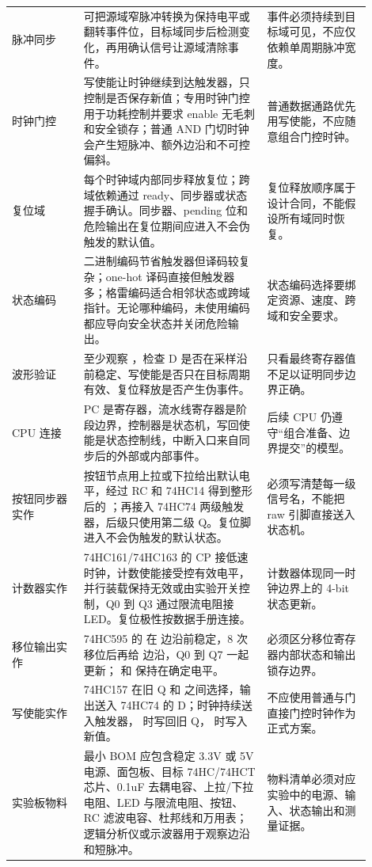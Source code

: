 \begin{longtable}{L{0.18\linewidth}L{0.46\linewidth}L{0.26\linewidth}}
脉冲同步 & 可把源域窄脉冲转换为保持电平或翻转事件位，目标域同步后检测变化，再用确认信号让源域清除事件。 & 事件必须持续到目标域可见，不应仅依赖单周期脉冲宽度。 \\
时钟门控 & 写使能让时钟继续到达触发器，只控制是否保存新值；专用时钟门控用于功耗控制并要求 enable 无毛刺和安全锁存；普通 AND 门切时钟会产生短脉冲、额外边沿和不可控偏斜。 & 普通数据通路优先用写使能，不应随意组合门控时钟。 \\
复位域 & 每个时钟域内部同步释放复位；跨域依赖通过 ready、同步器或状态握手确认。同步器、pending 位和危险输出在复位期间应进入不会伪触发的默认值。 & 复位释放顺序属于设计合同，不能假设所有域同时恢复。 \\
状态编码 & 二进制编码节省触发器但译码较复杂；one-hot 译码直接但触发器多；格雷编码适合相邻状态或跨域指针。无论哪种编码，未使用编码都应导向安全状态并关闭危险输出。 & 状态编码选择要绑定资源、速度、跨域和安全要求。 \\
波形验证 & 至少观察 ，检查 D 是否在采样沿前稳定、写使能是否只在目标周期有效、复位释放是否产生伪事件。 & 只看最终寄存器值不足以证明同步边界正确。 \\
CPU 连接 & PC 是寄存器，流水线寄存器是阶段边界，控制器是状态机，写回使能是状态控制线，中断入口来自同步后的外部或内部事件。 & 后续 CPU 仍遵守“组合准备、边界提交”的模型。 \\
按钮同步器实作 & 按钮节点用上拉或下拉给出默认电平，经过 RC 和 74HC14 得到整形后的 ；再接入 74HC74 两级触发器，后级只使用第二级 Q。复位脚进入不会伪触发的默认状态。 & 必须写清楚每一级信号名，不能把 raw 引脚直接送入状态机。 \\
计数器实作 & 74HC161/74HC163 的 CP 接低速时钟，计数使能接受控有效电平，并行装载保持无效或由实验开关控制，Q0 到 Q3 通过限流电阻接 LED。复位极性按数据手册连接。 & 计数器体现同一时钟边界上的 4-bit 状态更新。 \\
移位输出实作 & 74HC595 的  在  边沿前稳定，8 次移位后再给  边沿，Q0 到 Q7 一起更新； 和  保持在确定电平。 & 必须区分移位寄存器内部状态和输出锁存边界。 \\
写使能实作 & 74HC157 在旧 Q 和  之间选择，输出送入 74HC74 的 D；时钟持续送入触发器， 时写回旧 Q， 时写入新值。 & 不应使用普通与门直接门控时钟作为正式方案。 \\
实验板物料 & 最小 BOM 应包含稳定 3.3V 或 5V 电源、面包板、目标 74HC/74HCT 芯片、0.1uF 去耦电容、上拉/下拉电阻、LED 与限流电阻、按钮、RC 滤波电容、杜邦线和万用表；逻辑分析仪或示波器用于观察边沿和短脉冲。 & 物料清单必须对应实验中的电源、输入、状态输出和测量证据。 \\

\end{longtable}
